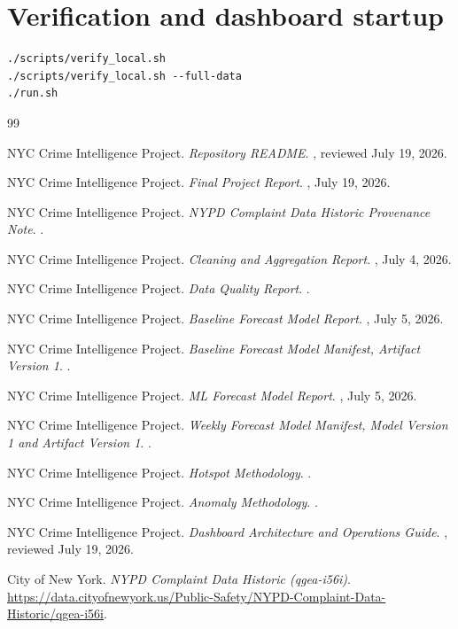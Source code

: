 \documentclass[11pt,oneside]{report}
\begin{document}
\section{Verification and dashboard startup}

\begin{verbatim}
./scripts/verify_local.sh
./scripts/verify_local.sh --full-data
./run.sh
\end{verbatim}

\clearpage
\begin{thebibliography}{99}

NYC Crime Intelligence Project.
\emph{Repository README}.
, reviewed July 19, 2026.

NYC Crime Intelligence Project.
\emph{Final Project Report}.
, July 19, 2026.

NYC Crime Intelligence Project.
\emph{NYPD Complaint Data Historic Provenance Note}.
.

NYC Crime Intelligence Project.
\emph{Cleaning and Aggregation Report}.
, July 4, 2026.

NYC Crime Intelligence Project.
\emph{Data Quality Report}.
.

NYC Crime Intelligence Project.
\emph{Baseline Forecast Model Report}.
, July 5, 2026.

NYC Crime Intelligence Project.
\emph{Baseline Forecast Model Manifest, Artifact Version 1}.
.

NYC Crime Intelligence Project.
\emph{ML Forecast Model Report}.
, July 5, 2026.

NYC Crime Intelligence Project.
\emph{Weekly Forecast Model Manifest, Model Version 1 and Artifact Version 1}.
.

NYC Crime Intelligence Project.
\emph{Hotspot Methodology}.
.

NYC Crime Intelligence Project.
\emph{Anomaly Methodology}.
.

NYC Crime Intelligence Project.
\emph{Dashboard Architecture and Operations Guide}.
, reviewed July 19, 2026.

City of New York.
\emph{NYPD Complaint Data Historic (qgea-i56i)}.
\url{https://data.cityofnewyork.us/Public-Safety/NYPD-Complaint-Data-Historic/qgea-i56i}.

\end{thebibliography}
\end{document}
